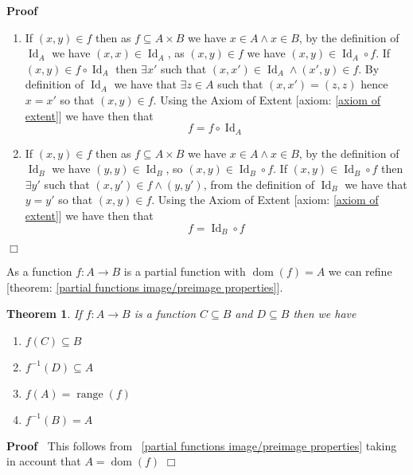 \documentclass{book}
\newcommand{\tmop}[1]{\ensuremath{\operatorname{#1}}}
\newenvironment{proof}{\noindent\textbf{Proof\ }}{\hspace*{\fill}$\Box$\medskip}
\newtheorem{theorem}{Theorem}
\begin{document}
\begin{proof}
  
  \begin{enumerate}
    \item If $(x, y) \in f$ then as $f \subseteq A \times B$ we have $x \in A
    \wedge x \in B$, by the definition of $\tmop{Id}_A$ we have $(x, x) \in
    \tmop{Id}_A$, as $(x, y) \in f$ we have $(x, y) \in \tmop{Id}_A \circ f$.
    If $(x, y) \in f \circ \tmop{Id}_A$ then $\exists x'$ such that $(x, x')
    \in \tmop{Id}_A \wedge (x', y) \in f$. By definition of $\tmop{Id}_A$ we
    have that $\exists z \in A$ such that $(x, x') = (z, z)$ hence $x = x'$ so
    that $(x, y) \in f$. Using the Axiom of Extent [axiom: \ref{axiom of
    extent}] we have then that
    \[ f = f \circ \tmop{Id}_A \]
    \item If $(x, y) \in f$ then as $f \subseteq A \times B$ we have $x \in A
    \wedge x \in B$, by the definition of $\tmop{Id}_B$ we have $(y, y) \in
    \tmop{Id}_B$, so $(x, y) \in \tmop{Id}_B \circ f$. If $(x, y) \in
    \tmop{Id}_B \circ f$ then $\exists y'$ such that $(x, y') \in f \wedge (y,
    y')$, from the definition of $\tmop{Id}_B$ we have that $y = y'$ so that
    $(x, y) \in f$. Using the Axiom of Extent [axiom: \ref{axiom of extent}]
    we have then that
    \[ f = \tmop{Id}_B \circ f \]
  \end{enumerate}
\end{proof}

As a function $f : A \rightarrow B$ is a partial function with $\tmop{dom} (f)
= A$ we can refine [theorem: \ref{partial functions image/preimage
properties}].

\begin{theorem}
  \label{function image preimage}If $f : A \rightarrow B$ is a function $C
  \subseteq B$ and $D \subseteq B$ then we have
  \begin{enumerate}
    \item $f (C) \subseteq B$
    
    \item $f^{- 1} (D) \subseteq A$
    
    \item $f (A) = \tmop{range} (f)$
    
    \item $f^{- 1} (B) = A$
  \end{enumerate}
\end{theorem}

\begin{proof}
  This follows from \ \ref{partial functions image/preimage properties} taking
  in account that $A = \tmop{dom} (f)$
\end{proof}
\end{document}
